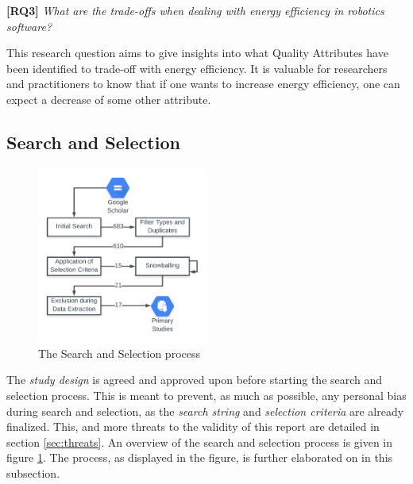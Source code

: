 \vspace{5mm}

\textbf{[RQ3]} \textit{What are the trade-offs when dealing with energy efficiency in robotics software?}

\vspace{5mm}

This research question aims to give insights into what Quality Attributes have been identified to trade-off with energy efficiency. 
It is valuable for researchers and practitioners to know that if one wants to increase energy efficiency, one can expect a decrease of some other attribute.

\subsection{Search and Selection}
\label{sec:study_design:search_selection}
\begin{figure}
    \centering
    \includegraphics[width=0.5\textwidth]{figures/selection_process_var2.png}
    \caption{The Search and Selection process}
    \label{fig:search_selec_process}
\end{figure}

The \textit{study design} is agreed and approved upon before starting the search and selection process. 
This is meant to prevent, as much as possible, any personal bias during search and selection, as the \textit{search string} and \textit{selection criteria} are already finalized.
This, and more threats to the validity of this report are detailed in section \ref{sec:threats}.
An overview of the search and selection process is given in figure \ref{fig:search_selec_process}.
The process, as displayed in the figure, is further elaborated on in this subsection.

\vspace{5mm}

